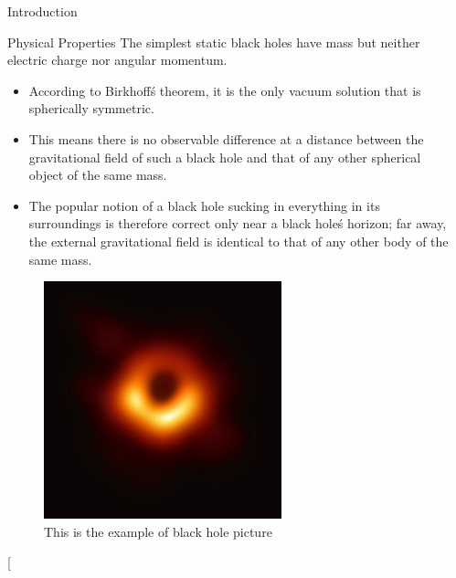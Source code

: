 \documentclass[20pt]{beamer}
\begin{document}
\begin{frame}[t]
\begin{columns}[t]
\begin{column}{0.32\linewidth}
\begin{block}{Introduction}
\end{block}

\begin{block}{Physical Properties}
The simplest static black holes have mass but neither electric charge nor angular momentum. 

\begin{itemize}

\item According to Birkhoff\'s theorem, it is the only vacuum solution that is spherically symmetric.

\item  This means there is no observable difference at a distance between the gravitational field of such a black hole and that of any other spherical object of the same mass.

\item  The popular notion of a black hole sucking in everything in its surroundings is therefore correct only near a black hole\'s horizon; far away, the external gravitational field is identical to that of any other body of the same mass.

\end{itemize}
 
\begin{figure}
	\includegraphics[scale=2.5]{blackhole.jpg}
 	\caption{ This is the example of black hole picture }

\end{figure}[

\end{block}

\end{column}


\begin{column}{0.32\linewidth}


\end{column}
\end{columns}
\end{frame}
\end{document}
